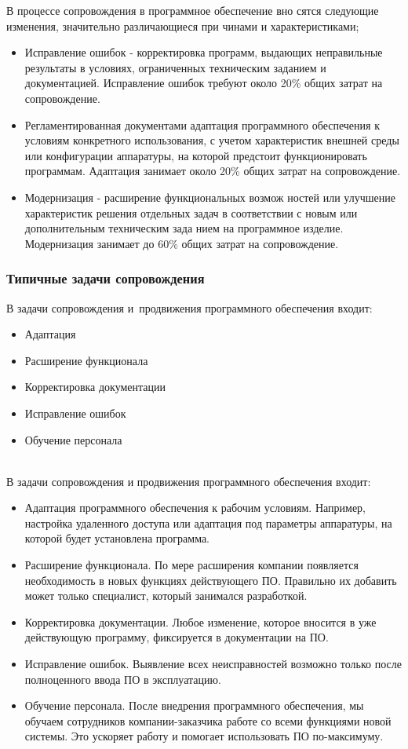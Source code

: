 \documentclass{../industrial-development}
\begin{document}
В процессе сопровождения в программное обеспечение вно сятся следующие изменения, значительно различающиеся при чинами и характеристиками;
\begin{itemize}
\item Исправление ошибок - корректировка программ, выдающих неправильные результаты в условиях, ограниченных техническим заданием и документацией. Исправление ошибок требуют около 20\% общих затрат на сопровождение.
\item Регламентированная документами адаптация программного обеспечения к условиям конкретного использования, с учетом характеристик внешней среды или конфигурации аппаратуры, на которой предстоит функционировать программам. Адаптация занимает около 20\% общих затрат на сопровождение.
\item Модернизация - расширение функциональных возмож ностей или улучшение характеристик решения отдельных задач в соответствии с новым или дополнительным техническим зада нием на программное изделие. Модернизация занимает до 60\% общих затрат на сопровождение.
\end{itemize}

\begin{frame} \frametitle{Типичные задачи сопровождения}
В задачи сопровождения и~продвижения программного обеспечения входит:
\begin{itemize}
	\item Адаптация
	\item Расширение функционала
	\item Корректировка документации
	\item Исправление ошибок
	\item Обучение персонала
\end{itemize}
\end{frame}
\lecturenotes
\\В задачи сопровождения и продвижения программного обеспечения входит:\\
\begin{itemize}
	\item Адаптация программного обеспечения к рабочим условиям. Например, настройка удаленного доступа или адаптация под параметры аппаратуры, на которой будет установлена программа.
	\item Расширение функционала. По мере расширения компании появляется необходимость в новых функциях действующего ПО. Правильно их добавить может только специалист, который занимался разработкой.
	\item Корректировка документации. Любое изменение, которое вносится в уже действующую программу, фиксируется в документации на ПО.
	\item Исправление ошибок. Выявление всех неисправностей возможно только после полноценного ввода ПО в эксплуатацию.
	\item Обучение персонала. После внедрения программного обеспечения, мы обучаем сотрудников компании-заказчика работе со всеми функциями новой системы. Это ускоряет работу и помогает использовать ПО по-максимуму. 
\end{itemize}
\end{document}
